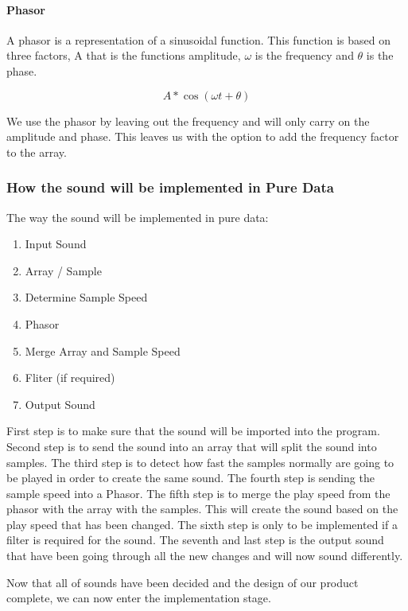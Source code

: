     

\paragraph{Phasor} %
\label{par:phasor}

A phasor is a representation of a sinusoidal function. 
This function is based on three factors, A that is the functions amplitude, $\omega$ is the frequency and $\theta$ is the phase.  

\begin{equation}
    A * \cos(\omega t + \theta)
\end{equation}

We use the phasor by leaving out the frequency and will only carry on the amplitude and phase. 
This leaves us with the option to add the frequency factor to the array.



\subsubsection{How the sound will be implemented in Pure Data} %
\label{ssub:how_the_sound_will_be_implemented_in_pure_data}

The way the sound will be implemented in pure data:

\begin{enumerate}
    \item Input Sound
    \item Array / Sample
    \item Determine Sample Speed
    \item Phasor
    \item Merge Array and Sample Speed
    \item Fliter (if required)
    \item Output Sound
\end{enumerate}

First step is to make sure that the sound will be imported into the program. 
Second step is to send the sound into an array that will split the sound into samples. 
The third step is to detect how fast the samples normally are going to be played in order to create the same sound. 
The fourth step is sending the sample speed into a Phasor. 
The fifth step is to merge the play speed from the phasor with the array with the samples. 
This will create the sound based on the play speed that has been changed. 
The sixth step is only to be implemented if a filter is required for the sound. 
The seventh and last step is the output sound that have been going through all the new changes and will now sound differently.

Now that all of sounds have been decided and the design of our product complete, we can now enter the implementation stage. 




